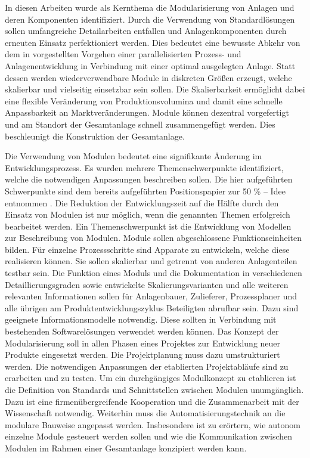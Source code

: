 In diesen Arbeiten wurde als Kernthema die Modularisierung von Anlagen und deren Komponenten identifiziert. Durch die Verwendung von Standardl\"osungen sollen umfangreiche Detailarbeiten entfallen und Anlagenkomponenten durch erneuten Einsatz perfektioniert werden. Dies bedeutet eine bewusste Abkehr von dem in \cite{Dietz_2000} vorgestellten Vorgehen einer parallelisierten Prozess- und Anlagenentwicklung in Verbindung mit einer optimal ausgelegten Anlage. Statt dessen werden wiederverwendbare Module in diskreten Gr\"o\ss{}en erzeugt, welche skalierbar und vielseitig einsetzbar sein sollen. Die Skalierbarkeit erm\"oglicht dabei eine flexible Ver\"anderung von Produktionsvolumina und damit eine schnelle Anpassbarkeit an Marktver\"anderungen. Module k\"onnen dezentral vorgefertigt und am Standort der Gesamtanlage schnell zusammengef\"ugt werden. Dies beschleunigt die Konstruktion der Gesamtanlage. \par

Die Verwendung von Modulen bedeutet eine signifikante \"Anderung im Entwicklungsprozess. Es wurden mehrere Themenschwerpunkte identifiziert, welche die notwendigen Anpassungen beschreiben sollen. Die hier aufgef\"uhrten Schwerpunkte sind dem bereits aufgef\"uhrten Positionspapier zur 50 \% -- Idee entnommen \cite{Processnet_2010}.  Die Reduktion der Entwicklungszeit auf die H\"alfte durch den Einsatz von Modulen ist nur m\"oglich, wenn die genannten Themen erfolgreich bearbeitet werden. \linebreak
Ein Themenschwerpunkt ist die Entwicklung von Modellen zur Beschreibung von Modulen. Module sollen abgeschlossene Funktionseinheiten bilden. F\"ur einzelne Prozessschritte sind Apparate zu entwickeln, welche diese realisieren k\"onnen. Sie sollen skalierbar und getrennt von anderen Anlagenteilen testbar sein. \linebreak
Die Funktion eines Moduls und die Dokumentation in verschiedenen Detaillierungsgraden sowie entwickelte Skalierungsvarianten und alle weiteren relevanten Informationen sollen f\"ur Anlagenbauer, Zulieferer, Prozessplaner und alle \"ubrigen am Produktentwicklungszyklus Beteiligten abrufbar sein. Dazu sind geeignete Informationsmodelle notwendig. Diese sollten in Verbindung mit bestehenden Softwarel\"osungen verwendet werden k\"onnen. \linebreak
Das Konzept der Modularisierung soll in allen Phasen eines Projektes zur Entwicklung neuer Produkte eingesetzt werden. Die Projektplanung muss dazu umstrukturiert werden. Die notwendigen Anpassungen der etablierten Projektabl\"aufe sind zu erarbeiten und zu testen. \linebreak
Um ein durchg\"angiges Modulkonzept zu etablieren ist die Definition von Standards und Schnittstellen zwischen Modulen unumg\"anglich. Dazu ist eine firmen\"ubergreifende Kooperation und die Zusammenarbeit mit der Wissenschaft notwendig. \linebreak
Weiterhin muss die Automatisierungstechnik an die modulare Bauweise angepasst werden. Insbesondere ist zu er\"ortern, wie autonom einzelne Module gesteuert werden sollen und wie die Kommunikation zwischen Modulen im Rahmen einer Gesamtanlage konzipiert werden kann.

